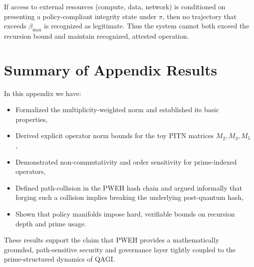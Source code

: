 \documentclass[11pt]{article}
\begin{document}
\begin{corollary}
If access to external resources (compute, data, network) is conditioned on presenting a policy-compliant integrity state under \(\pi\), then no trajectory that exceeds \(\beta_{\max}\) is recognized as legitimate.
Thus the system cannot both exceed the recursion bound and maintain recognized, attested operation.
\end{corollary}

\section{Summary of Appendix Results}

In this appendix we have:
\begin{itemize}[leftmargin=1.5em]
  \item Formalized the multiplicity-weighted norm and established its basic properties,
  \item Derived explicit operator norm bounds for the toy PITN matrices \(M_2, M_3, M_5\),
  \item Demonstrated non-commutativity and order sensitivity for prime-indexed operators,
  \item Defined path-collision in the PWEH hash chain and argued informally that forging such a collision implies breaking the underlying post-quantum hash,
  \item Shown that policy manifolds impose hard, verifiable bounds on recursion depth and prime usage.
\end{itemize}

These results support the claim that PWEH provides a mathematically grounded, path-sensitive security and governance layer tightly coupled to the prime-structured dynamics of QAGI.

\nocite{*}
  

\end{document}
